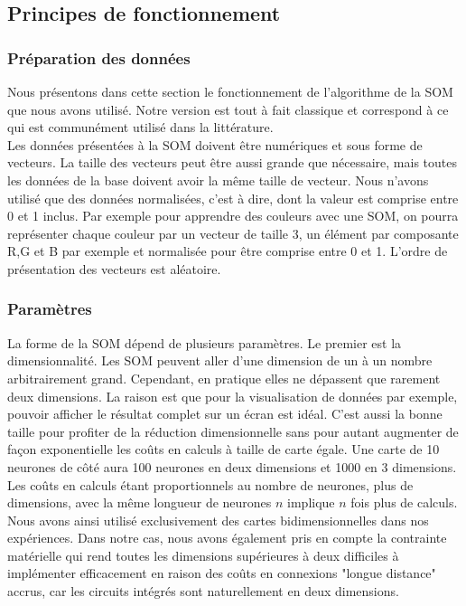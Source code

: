 \subsection{Principes de fonctionnement}
\subsubsection{Préparation des données}

	Nous présentons dans cette section le fonctionnement de l'algorithme de la SOM que nous avons utilisé. Notre version est tout à fait classique et correspond à ce qui est communément utilisé dans la littérature.\\

	Les données présentées à la SOM doivent être numériques et sous forme de vecteurs. La taille des vecteurs peut être aussi grande que nécessaire, mais toutes les données de la base doivent avoir la même taille de vecteur. Nous n'avons utilisé que des données normalisées, c'est à dire, dont la valeur est comprise entre 0 et 1 inclus. Par exemple pour apprendre des couleurs avec une SOM, on pourra représenter chaque couleur par un vecteur de taille 3, un élément par composante R,G et B par exemple et normalisée pour être comprise entre 0 et 1. L'ordre de présentation des vecteurs est aléatoire.

\subsubsection{Paramètres}\label{param_som}

	La forme de la SOM dépend de plusieurs paramètres. Le premier est la dimensionnalité. Les SOM peuvent aller d'une dimension de un à un nombre arbitrairement grand. Cependant, en pratique elles ne dépassent que rarement deux dimensions. La raison est que pour la visualisation de données par exemple, pouvoir afficher le résultat complet sur un écran est idéal. C'est aussi la bonne taille pour profiter de la réduction dimensionnelle sans pour autant augmenter de façon exponentielle les coûts en calculs à taille de carte égale. Une carte de 10 neurones de côté aura 100 neurones en deux dimensions et 1000 en 3 dimensions. Les coûts en calculs étant proportionnels au nombre de neurones, plus de dimensions, avec la même longueur de neurones $n$ implique $n$ fois plus de calculs. Nous avons ainsi utilisé exclusivement des cartes bidimensionnelles dans nos expériences. Dans notre cas, nous avons également pris en compte la contrainte matérielle qui rend toutes les dimensions supérieures à deux difficiles à implémenter efficacement en raison des coûts en connexions "longue distance" accrus, car les circuits intégrés sont naturellement en deux dimensions.
	
